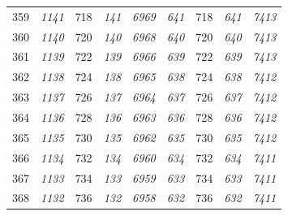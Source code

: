 \documentclass[10pt,fleqn]{article}
\begin{document}
\begin{longtable}{c|cccccccc}
359 & {\color{blue} \it 1141 \rm} & {\color{black} 718} & {\color{blue} \it 141 \rm} & {\color{blue} \it 6969 \rm} & {\color{blue} \it 641 \rm} & {\color{black} 718} & {\color{blue} \it 641 \rm} & {\color{blue} \it 7413 \rm} \\
360 & {\color{blue} \it 1140 \rm} & {\color{black} 720} & {\color{blue} \it 140 \rm} & {\color{blue} \it 6968 \rm} & {\color{blue} \it 640 \rm} & {\color{black} 720} & {\color{blue} \it 640 \rm} & {\color{blue} \it 7413 \rm} \\
361 & {\color{blue} \it 1139 \rm} & {\color{black} 722} & {\color{blue} \it 139 \rm} & {\color{blue} \it 6966 \rm} & {\color{blue} \it 639 \rm} & {\color{black} 722} & {\color{blue} \it 639 \rm} & {\color{blue} \it 7413 \rm} \\
362 & {\color{blue} \it 1138 \rm} & {\color{black} 724} & {\color{blue} \it 138 \rm} & {\color{blue} \it 6965 \rm} & {\color{blue} \it 638 \rm} & {\color{black} 724} & {\color{blue} \it 638 \rm} & {\color{blue} \it 7412 \rm} \\
363 & {\color{blue} \it 1137 \rm} & {\color{black} 726} & {\color{blue} \it 137 \rm} & {\color{blue} \it 6964 \rm} & {\color{blue} \it 637 \rm} & {\color{black} 726} & {\color{blue} \it 637 \rm} & {\color{blue} \it 7412 \rm} \\
364 & {\color{blue} \it 1136 \rm} & {\color{black} 728} & {\color{blue} \it 136 \rm} & {\color{blue} \it 6963 \rm} & {\color{blue} \it 636 \rm} & {\color{black} 728} & {\color{blue} \it 636 \rm} & {\color{blue} \it 7412 \rm} \\
365 & {\color{blue} \it 1135 \rm} & {\color{black} 730} & {\color{blue} \it 135 \rm} & {\color{blue} \it 6962 \rm} & {\color{blue} \it 635 \rm} & {\color{black} 730} & {\color{blue} \it 635 \rm} & {\color{blue} \it 7412 \rm} \\
366 & {\color{blue} \it 1134 \rm} & {\color{black} 732} & {\color{blue} \it 134 \rm} & {\color{blue} \it 6960 \rm} & {\color{blue} \it 634 \rm} & {\color{black} 732} & {\color{blue} \it 634 \rm} & {\color{blue} \it 7411 \rm} \\
367 & {\color{blue} \it 1133 \rm} & {\color{black} 734} & {\color{blue} \it 133 \rm} & {\color{blue} \it 6959 \rm} & {\color{blue} \it 633 \rm} & {\color{black} 734} & {\color{blue} \it 633 \rm} & {\color{blue} \it 7411 \rm} \\
368 & {\color{blue} \it 1132 \rm} & {\color{black} 736} & {\color{blue} \it 132 \rm} & {\color{blue} \it 6958 \rm} & {\color{blue} \it 632 \rm} & {\color{black} 736} & {\color{blue} \it 632 \rm} & {\color{blue} \it 7411 \rm} \\

\end{longtable}
\end{document}
